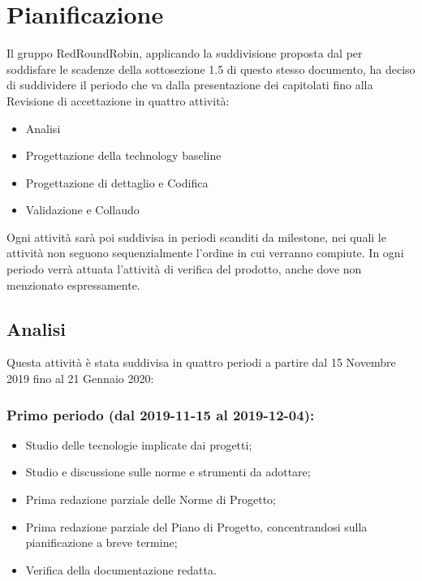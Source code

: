 \section{Pianificazione}
	Il gruppo RedRoundRobin, applicando la suddivisione proposta dal  per soddisfare le scadenze della sottosezione 1.5 di questo stesso documento, ha deciso di suddividere il periodo che va dalla presentazione dei capitolati fino alla Revisione di accettazione in quattro attività:
	\begin{itemize}
		\item Analisi
		\item Progettazione della technology baseline
		\item Progettazione di dettaglio e Codifica
		\item Validazione e Collaudo
	\end{itemize}
	Ogni attività sarà poi suddivisa in periodi scanditi da milestone, nei quali le attività non seguono sequenzialmente l'ordine in cui verranno compiute.
	In ogni periodo verrà attuata l'attività di verifica del prodotto, anche dove non menzionato espressamente. 

	\subsection{Analisi}
	Questa attività è stata suddivisa in quattro periodi a partire dal 15 Novembre 2019 fino al 21 Gennaio 2020:

		\subsubsection{Primo periodo (dal 2019-11-15 al 2019-12-04):}
		\begin{itemize}
			\item Studio delle tecnologie implicate dai progetti;
			\item Studio e discussione sulle norme e strumenti da adottare;
			\item Prima redazione parziale delle Norme di Progetto;
			\item Prima redazione parziale del Piano di Progetto, concentrandosi sulla pianificazione a breve termine;
			\item Verifica della documentazione redatta.
		\end{itemize}
